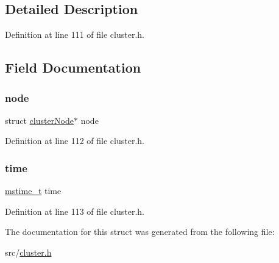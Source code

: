 \subsection{Detailed Description}


Definition at line 111 of file cluster.\+h.



\subsection{Field Documentation}
\mbox{\label{structcluster_node_fail_report_a7aa2bc440db9dc659120a310878cac0f}} 
\subsubsection{\texorpdfstring{node}{node}}
{\footnotesize\ttfamily struct \hyperlink{structcluster_node}{cluster\+Node}$\ast$ node}



Definition at line 112 of file cluster.\+h.

\mbox{\label{structcluster_node_fail_report_a1f28210ccf56a01319b20295b8ff190e}} 
\subsubsection{\texorpdfstring{time}{time}}
{\footnotesize\ttfamily \hyperlink{redismodule_8h_a652ae61e2475bc8957454534544968fc}{mstime\+\_\+t} time}



Definition at line 113 of file cluster.\+h.



The documentation for this struct was generated from the following file\+:\begin{DoxyCompactItemize}
\item 
src/\hyperlink{cluster_8h}{cluster.\+h}\end{DoxyCompactItemize}
